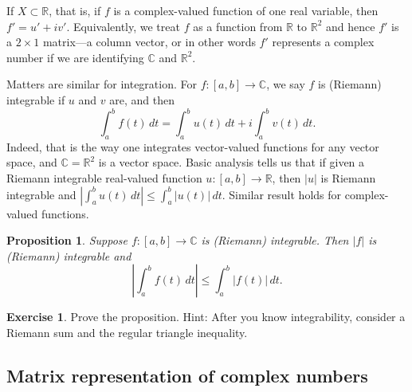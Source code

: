 \documentclass[12pt,openany]{book}
\newcommand{\sabs}[1]{\lvert {#1} \rvert}
\newcommand{\abs}[1]{\left\lvert {#1} \right\rvert}
\newcommand{\C}{{\mathbb{C}}}
\newcommand{\R}{{\mathbb{R}}}
\theoremstyle{plain}
\newtheorem{prop}[thm]{Proposition}
\theoremstyle{remark}
\theoremstyle{definition}
\newenvironment{exbox}{%
    \def\FrameCommand{\vrule width 1pt \relax\hspace{10pt}}%
    \MakeFramed{\advance\hsize-\width\FrameRestore}%
}{%
    \endMakeFramed
}
\theoremstyle{exercise}
\newtheorem{exercise}{Exercise}[section]
\theoremstyle{example}
\begin{document}
If $X \subset \R$, that is, if $f$ is a complex-valued
function of one real variable, then $f' = u' + iv'$.
Equivalently, we treat $f$ as a function from $\R$ to $\R^2$
and hence $f'$ is a $2 \times 1$ matrix---a column vector, or in other words
$f'$ represents a complex number if we are identifying $\C$ and $\R^2$.

Matters are similar for integration.
For $f \colon [a,b] \to \C$,
we say $f$ is (Riemann) integrable if $u$ and $v$ are, and then
\begin{equation*}
\int_a^b f(t) \, dt = 
\int_a^b u(t) \, dt + i \int_a^b v(t) \, dt .
\end{equation*}
Indeed, that is the way one integrates vector-valued functions
for any vector space, and $\C = \R^2$ is a vector space.
Basic analysis tells us that
if given a Riemann integrable
real-valued function $u \colon [a,b] \to \R$,
then $\abs{u}$ is Riemann
integrable and $\abs{\int_a^b u(t) \, dt} \leq \int_a^b \sabs{u(t)} \, dt$.
Similar result holds for complex-valued functions.

\begin{prop} \label{prop:inttriangleineq}
Suppose $f \colon [a,b] \to \C$ is (Riemann) integrable.  Then $\sabs{f}$ is
(Riemann) integrable and
\begin{equation*}
\abs{\int_a^b f(t) \, dt} \leq 
\int_a^b \abs{f(t)} \, dt .
\end{equation*}
\end{prop}

\begin{exbox}
\begin{exercise}%
Prove the proposition.  Hint: After you know integrability, consider
a Riemann sum and the regular triangle inequality.
\end{exercise}
\end{exbox}

\subsection{Matrix representation of complex numbers}
\end{document}
